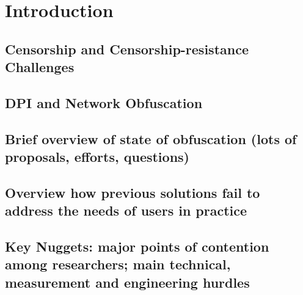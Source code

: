 %
\section{Introduction}
\label{section:intro}



\subsection{Censorship and Censorship-resistance Challenges}
\subsection{DPI and Network Obfuscation}

\subsection{Brief overview of state of obfuscation (lots of proposals, efforts, questions)}

\subsection{Overview how previous solutions fail to address the needs of users
in practice}
\subsection{Key Nuggets:  major points of contention among researchers; main technical, 
      measurement and engineering hurdles}

	
